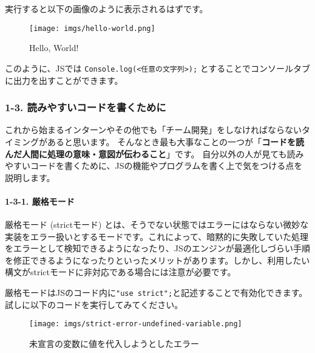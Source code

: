 実行すると以下の画像のように表示されるはずです。

\begin{figure}
\centering
\texttt{[image: imgs/hello-world.png]}
\caption{Hello, World!}
\end{figure}

このように、JSでは
\texttt{Console.log(\textless{}任意の文字列\textgreater{});}
とすることでコンソールタブに出力を出すことができます。

\subsubsection{1-3.
読みやすいコードを書くために}\label{ux8aadux307fux3084ux3059ux3044ux30b3ux30fcux30c9ux3092ux66f8ux304fux305fux3081ux306b}

これから始まるインターンやその他でも「チーム開発」をしなければならないタイミングがあると思います。
そんなとき最も大事なことの一つが「\textbf{コードを読んだ人間に処理の意味・意図が伝わること}」です。
自分以外の人が見ても読みやすいコードを書くために、JSの機能やプログラムを書く上で気をつける点を説明します。

\paragraph{1-3-1. 厳格モード}\label{ux53b3ux683cux30e2ux30fcux30c9}

厳格モード (strictモード)
とは、そうでない状態ではエラーにはならない微妙な実装をエラー扱いとするモードです。これによって、暗黙的に失敗していた処理をエラーとして検知できるようになったり、JSのエンジンが最適化しづらい手順を修正できるようになったりといったメリットがあります。しかし、利用したい構文がstrictモードに非対応である場合には注意が必要です。

厳格モードはJSのコード内に\texttt{"use\ strict";}と記述することで有効化できます。
試しに以下のコードを実行してみてください。

\begin{Shaded}
\begin{Highlighting}[]
\OperatorTok{;}
\OperatorTok{=} \OperatorTok{;}
\end{Highlighting}
\end{Shaded}

\begin{figure}
\centering
\texttt{[image: imgs/strict-error-undefined-variable.png]}
\caption{未宣言の変数に値を代入しようとしたエラー}
\end{figure}

